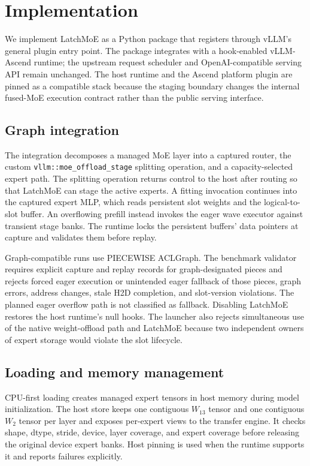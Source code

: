 \section{Implementation}
\label{sec:implementation}

We implement LatchMoE as a Python package that registers through vLLM's general
plugin entry point. The package integrates with a hook-enabled vLLM-Ascend
runtime; the upstream request scheduler and OpenAI-compatible serving API
remain unchanged. The host runtime and the Ascend platform plugin are pinned as
a compatible stack because the staging boundary changes the internal fused-MoE
execution contract rather than the public serving interface.

\subsection{Graph integration}

The integration decomposes a managed MoE layer into a captured router, the
custom \texttt{vllm::moe\_offload\_stage} splitting operation, and a
capacity-selected expert path. The splitting operation returns control to the
host after routing so that LatchMoE can stage the active experts. A fitting
invocation continues into the captured expert MLP, which reads persistent slot
weights and the logical-to-slot buffer. An overflowing prefill instead invokes
the eager wave executor against transient stage banks. The runtime locks the
persistent buffers' data pointers at capture and validates them before replay.

Graph-compatible runs use PIECEWISE ACLGraph. The benchmark validator requires
explicit capture and replay records for graph-designated pieces and rejects
forced eager execution or unintended eager fallback of those pieces, graph
errors, address changes, stale H2D completion, and slot-version violations. The
planned eager overflow path is not classified as fallback. Disabling LatchMoE
restores the host runtime's null hooks. The
launcher also rejects simultaneous use of the native weight-offload path and
LatchMoE because two independent owners of expert storage would violate the
slot lifecycle.

\subsection{Loading and memory management}

CPU-first loading creates managed expert tensors in host memory during model
initialization. The host store keeps one contiguous $W_{13}$ tensor and one
contiguous $W_2$ tensor per layer and exposes per-expert views to the transfer
engine. It checks shape, dtype, stride, device, layer coverage, and expert
coverage before releasing the original device expert banks. Host pinning is
used when the runtime supports it and reports failures explicitly.

